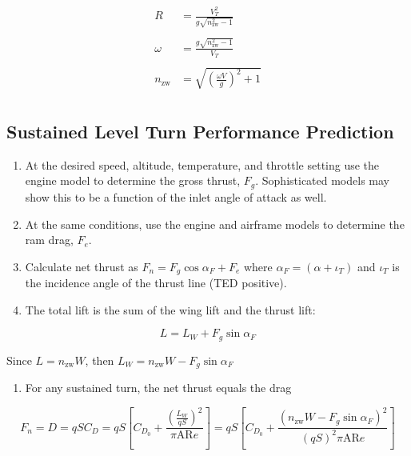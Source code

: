 \documentclass[
]{book}
\providecommand{\tightlist}{%
  \setlength{\itemsep}{0pt}\setlength{\parskip}{0pt}}
\begin{document}
\[
\begin{align}
R &= \frac{V_T^2}{g \sqrt{n_{\text{zw}}^2 - 1}} \\
\\
\omega &= \frac{g \sqrt{n_{\text{zw}}^2 - 1}}{V_T} \\
\\
n_{\text{zw}} &= \sqrt{ \left( \frac{\omega V}{g} \right)^2 + 1  } \\
\end{align}
\label{eq:r-omega-n-zw}
\]

\hypertarget{sustained-level-turn-performance-prediction}{%
\subsection{Sustained Level Turn Performance Prediction}\label{sustained-level-turn-performance-prediction}}

\begin{enumerate}
\def\labelenumi{\arabic{enumi}.}
\item
  At the desired speed, altitude, temperature, and throttle setting use the
  engine model to determine the gross thrust, \(F_g\). Sophisticated models may
  show this to be a function of the inlet angle of attack as well.
\item
  At the same conditions, use the engine and airframe models to determine the
  ram drag, \(F_e\).
\item
  Calculate net thrust as \(F_n = F_g \cos \alpha_F + F_e\) where
  \(\alpha_F = \left(\alpha + \iota_T \right)\) and \(\iota_T\) is the incidence angle of
  the thrust line (TED positive).
\item
  The total lift is the sum of the wing lift and the thrust lift:
\end{enumerate}

\[
L = L_W + F_g \sin \alpha_F
\]

Since \(L = n_{\text{zw}} W\), then \(L_W = n_{\text{zw}} W - F_g \sin \alpha_F\)

\begin{enumerate}
\def\labelenumi{\arabic{enumi}.}
\setcounter{enumi}{4}
\tightlist
\item
  For any sustained turn, the net thrust equals the drag
\end{enumerate}

\[
F_n = D = qSC_D = 
qS \left[ 
      C_{D_0} + 
      \frac{\left( \frac{L_W}{qS} \right)^2}{\pi \mathrm{AR}e} 
   \right] =
qS \left[
      C_{D_0} + 
      \frac{\left( n_{\text{zw}} W - F_g \sin \alpha_F \right)^2}
           {\left(qS\right)^2 \pi \mathrm{AR}e} 
   \right]
\]
\end{document}
